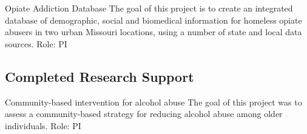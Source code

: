 \documentclass{nihbiosketch}
\begin{document}
\bigskip

{Opiate Addiction Database}
{The goal of this project is to create an integrated database of demographic, social and biomedical 
information for homeless opiate abusers in two urban Missouri locations, using a number of state and 
local data sources.}
{Role: PI}



\subsection*{Completed Research Support}

{Community-based intervention for alcohol abuse}
{The goal of this project was to assess a community-based strategy for reducing alcohol abuse among 
older individuals.}
{Role: PI}
\end{document}

